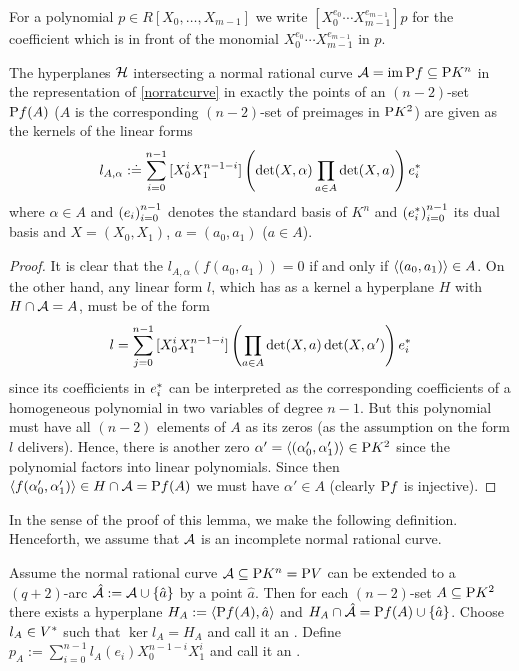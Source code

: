 \begin{notation}
    For a polynomial $p\in R[X_0,\ldots,X_{m-1}]$ we write $[X_0^{e_0}\cdots X_{m-1}^{e_{m-1}}]p$ for the coefficient which is in front of the monomial $X_0^{e_0}\cdots X_{m-1}^{e_{m-1}}$ in $p$.
\end{notation}

\begin{lemma}\label{norrattandesc}
    The hyperplanes $\mathcal{H}$ intersecting a normal rational curve $\mathcal{A}=\mathop\mathrm{im}\mathrm{P}{f}\subseteq \mathrm{P}{K^n}$ in the representation of \autoref{norratcurve} in exactly the points of an $(n-2)$-set $\mathrm{P}{f}(A)$ ($A$ is the corresponding $(n-2)$-set of preimages in $\P K^2$) are given as the kernels of the linear forms 
    $$
    l_{A,\alpha}:\doteq\sum_{i=0}^{n-1}{[X_0^i X_1^{n-1-i}]\left(\det(X,\alpha)\prod_{a\in A}{\det(X,a)}\right){e}^{\ast}_i}
    $$
    where $\alpha\in A$ and $\seq{e_i}_{i=0}^{n-1}$ denotes the standard basis of $K^n$ and $\seq{\dual e_i}_{i=0}^{n-1}$ its dual basis and $X=(X_0,X_1)$, $a=(a_0,a_1)$ ($a\in A$).  
\end{lemma}

\begin{proof}
    It is clear that the $l_{A,\alpha}(f(a_0,a_1))=0$ if and only if $\gen{(a_0,a_1)}\in A$. On the other hand, any linear form $l$, which has as a kernel a hyperplane $H$ with $H\cap\mathcal{A}=A$, must be of the form
    $$
    l=\sum_{j=0}^{n-1}{[X_0^i X_1^{n-1-i}]\left(\prod_{a\in A}{\det(X,a)}\det(X,\alpha')\right){e}^{\ast}_i}
    $$
    since its coefficients in ${e}^{\ast}_i$ can be interpreted as the corresponding coefficients of a homogeneous polynomial in two variables of degree $n-1$. But this polynomial must have all $(n-2)$ elements of $A$ as its zeros (as the assumption on the form $l$ delivers). Hence, there is another zero $\alpha'=\gen{(\alpha'_0,\alpha'_1)}\in\P K^2$ since the polynomial factors into linear polynomials. Since then $\gen{f(\alpha'_0,\alpha'_1)}\in H\setmeet\cA=\proj f(A)$ we must have $\alpha'\in A$ (clearly $\mathrm{P} f$ is injective).    
\end{proof}
In the sense of the proof of this lemma, we make the following definition.
Henceforth, we assume that $\mathcal{A}$ is an incomplete normal rational curve.

\begin{definition}
    Assume the normal rational curve $\mathcal{A}\subseteq \mathrm{P}{K^n}=\mathrm{P}{V}$ can be extended to a $(q+2)$-arc $\hat{\cA}:=\cA\setjoin\set{\hat{a}}$ by a point $\hat a$. Then for each $(n-2)$-set $A\subseteq\mathrm{P}{K^2}$ there exists a hyperplane $H_A:=\gen{\P f(A),\hat{a}}$ and $H_A\setmeet \hat{\cA}=\proj f(A)\setjoin\set{\hat{a}}$. Choose $l_A\in{V}^{\ast}$ such that $\ker{l_A}=H_A$ and call it an .
    Define $p_A:=\sum_{i=0}^{n-1}{l_A(e_i)X_0^{n-1-i}X_1^i}$ and call it an .
\end{definition}

